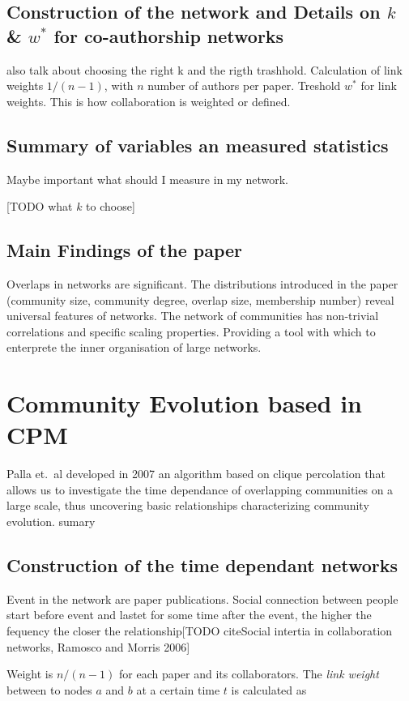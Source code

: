 \documentclass[runningheads,a4paper]{llncs}
\begin{document}
\subsection{Construction of the network and Details on $k$ \& $w^*$ for co-authorship networks}
\label{cpm-construction}
also talk about choosing the right k and the rigth trashhold. Calculation of link weights $1/(n-1)$, with $n$ number of authors per paper. Treshold $w^*$ for link weights. This is how collaboration is weighted or defined.

\subsection{Summary of variables an measured statistics}
Maybe important what should I measure in my network.

[TODO what $k$ to choose]

\subsection{Main Findings of the paper}
Overlaps in networks are significant. The distributions introduced in the paper (community size, community degree, overlap size, membership number) reveal universal features of networks. The network of communities has non-trivial correlations and specific scaling properties. Providing a tool with which to enterprete the inner organisation of large networks.

\section{Community Evolution based in CPM}
\label{evolution}
Palla et.~al developed \cite{palla2007quantifying} in 2007 an algorithm based on clique percolation that allows us to investigate the time dependance of overlapping communities on a large scale, thus uncovering basic relationships characterizing community evolution.
sumary

\subsection{Construction of the time dependant networks}
Event in the network are paper publications. Social connection between people start before event and lastet for some time after the event, the higher the fequency the closer the relationship[TODO citeSocial intertia in collaboration networks, Ramosco and Morris 2006]

Weight is $n/(n-1)$ for each paper and its collaborators.
The \emph{link weight} between to nodes $a$ and $b$ at a certain time $t$ is calculated as
\end{document}
